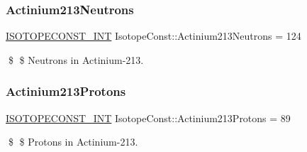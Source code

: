 \subsubsection{\texorpdfstring{Actinium213\+Neutrons}{Actinium213Neutrons}}
{\footnotesize\ttfamily \mbox{\hyperlink{group___isotope_const-_macros_ga5f18360b3e99483a35c32d789e62621c}{I\+S\+O\+T\+O\+P\+E\+C\+O\+N\+S\+T\+\_\+\+I\+NT}} Isotope\+Const\+::\+Actinium213\+Neutrons = 124}

\$ \$ Neutrons in Actinium-\/213. \mbox{\label{group___isotope_const-_actinium-_ac213_ga9140c5259e47d7389c58b376b91d40ad}} 
\subsubsection{\texorpdfstring{Actinium213\+Protons}{Actinium213Protons}}
{\footnotesize\ttfamily \mbox{\hyperlink{group___isotope_const-_macros_ga5f18360b3e99483a35c32d789e62621c}{I\+S\+O\+T\+O\+P\+E\+C\+O\+N\+S\+T\+\_\+\+I\+NT}} Isotope\+Const\+::\+Actinium213\+Protons = 89}

\$ \$ Protons in Actinium-\/213. 